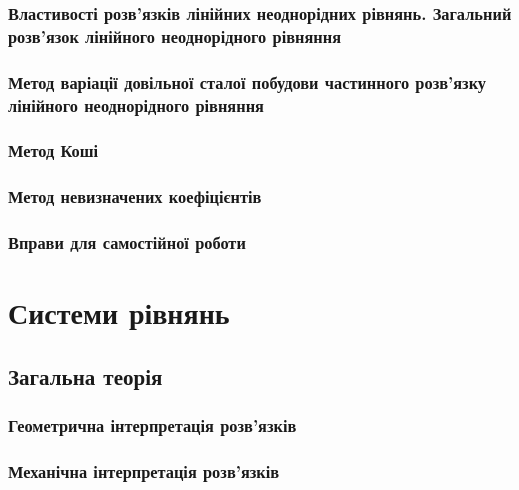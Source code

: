 		\subsubsection{Властивості розв'язків лінійних неоднорідних рівнянь. Загальний розв'язок лінійного неоднорідного рівняння}
		

		\subsubsection{Метод варіації довільної сталої побудови частинного роз\-в'яз\-ку лінійного неоднорідного рівняння}
		

		\subsubsection{Метод Коші}
		

		\subsubsection{Метод невизначених коефіцієнтів}
		

		\subsubsection{Вправи для самостійної роботи}
		

\section{Системи рівнянь}


	\subsection{Загальна теорія}
	

		\subsubsection{Геометрична інтерпретація розв'язків}
		

		\subsubsection{Механічна інтерпретація розв'язків}
		

